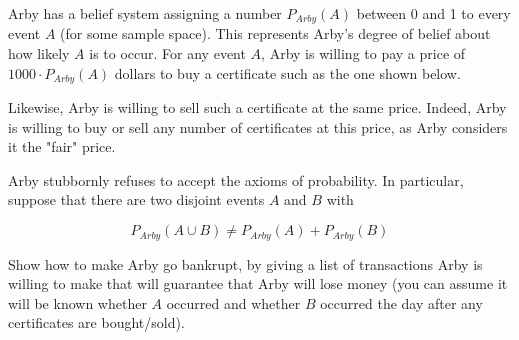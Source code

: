 \begin{exercise}{48}
Arby has a belief system assigning a number $P_{Arby}(A)$ between 0 and 1 to every event $A$ (for some sample space). This represents Arby's degree of belief about how likely $A$ is to occur. For any event $A$, Arby is willing to pay a price of $1000 \cdot P_{Arby}(A)$ dollars to buy a certificate such as the one shown below.

\vspace{1em}

\noindent{}
\vspace{1em}

Likewise, Arby is willing to sell such a certificate at the same price. Indeed, Arby is willing to buy or sell any number of certificates at this price, as Arby considers it the "fair" price.

Arby stubbornly refuses to accept the axioms of probability. In particular, suppose that there are two disjoint events $A$ and $B$ with

$$P_{Arby}(A \cup B) \neq P_{Arby}(A) + P_{Arby}(B)$$

Show how to make Arby go bankrupt, by giving a list of transactions Arby is willing to make that will guarantee that Arby will lose money (you can assume it will be known whether $A$ occurred and whether $B$ occurred the day after any certificates are bought/sold).
\end{exercise}



